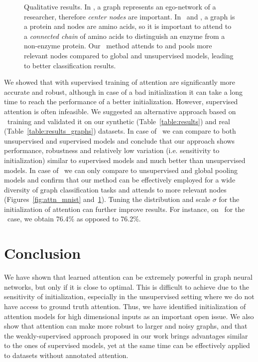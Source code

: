 \begin{figure}[tbhp]
\begin{center}
\begin{tabular}{cccccc}
		\end{tabular}
	\end{center}
	\vspace{-10pt}
	\caption{\small Qualitative results. In \collab, a graph represents an ego-network of a researcher, therefore \textit{center nodes} are important. In \proteins~and \dd, a graph is a protein and nodes are amino acids, so it is important to attend to a \textit{connected chain} of amino acids to distinguish an enzyme from a non-enzyme protein. Our \wsup~method attends to and pools more relevant nodes compared to global and unsupervised models, leading to better classification results. }
	\label{fig:attn_graphs}
\end{figure}

We showed that \gnns with supervised training of attention are significantly more accurate and robust, although in case of a bad initialization it can take a long time to reach the performance of a better initialization.
However, supervised attention is often infeasible. We suggested an alternative approach based on \wsup~training and validated it on our synthetic (Table~\ref{table:results}) and real (Table~\ref{table:results_graphs}) datasets. In case of \synthetic~we can compare to both unsupervised and supervised models and conclude that our approach shows performance, robustness and relatively low variation  (i.e. sensitivity to initialization) similar to supervised models and much better than unsupervised models. In case of \real~we can only compare to unsupervised and global pooling models and confirm that our method can be effectively employed for a wide diversity of graph classification tasks and attends to more relevant nodes (Figures~\ref{fig:attn_mnist} and~\ref{fig:attn_graphs}). Tuning the distribution and scale $\sigma$ for the initialization of attention can further improve results. For instance, on \proteins~for the \wsup~case, we obtain 76.4\% as opposed to 76.2\%.

\section{Conclusion}
We have shown that learned attention can be extremely powerful in graph neural networks, but only if it is close to optimal. This is difficult to achieve due to the sensitivity of initialization, especially in the unsupervised setting where we do not have access to ground truth attention. Thus, we have identified initialization of attention models for high dimensional inputs as an important open issue.
We also show that attention can make \gnns more robust to larger and noisy graphs, and that the weakly-supervised approach proposed in our work brings advantages similar to the ones of supervised models, yet at the same time can be effectively applied to datasets without annotated attention.

\vfill
\clearpage

